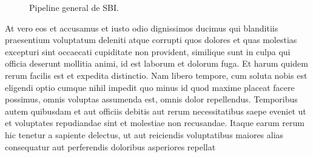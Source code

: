 \documentclass[11pt]{article}
\begin{document}
\begin{figure}[htbp]
    \centering
    \caption{Pipeline general de SBI.}
    \label{fig:sbi}
\end{figure}

At vero eos et accusamus et iusto odio dignissimos ducimus qui blanditiis praesentium voluptatum deleniti atque corrupti quos dolores et quas molestias excepturi sint occaecati cupiditate non provident, similique sunt in culpa qui officia deserunt mollitia animi, id est laborum et dolorum fuga. Et harum quidem rerum facilis est et expedita distinctio. Nam libero tempore, cum soluta nobis est eligendi optio cumque nihil impedit quo minus id quod maxime placeat facere possimus, omnis voluptas assumenda est, omnis dolor repellendus. Temporibus autem quibusdam et aut officiis debitis aut rerum necessitatibus saepe eveniet ut et voluptates repudiandae sint et molestiae non recusandae. Itaque earum rerum hic tenetur a sapiente delectus, ut aut reiciendis voluptatibus maiores alias consequatur aut perferendis doloribus asperiores repellat
\end{document}
